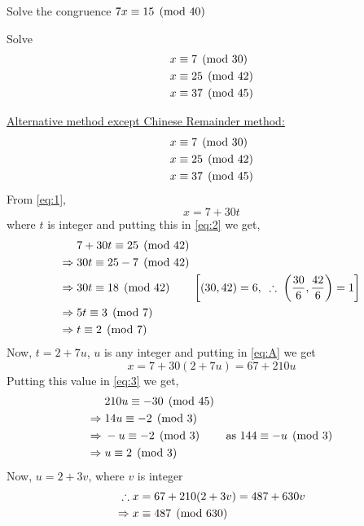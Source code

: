\documentclass[12pt]{book}
\begin{document}
\begin{qn}
    Solve the congruence $ 7x\equiv 15 \pmod{40} $
\end{qn}
\begin{qn}[100E]
    Solve
    \begin{align*}
        x&\equiv 7 \pmod{30}\\
        x&\equiv 25 \pmod{42}\\
        x&\equiv 37 \pmod{45}
    \end{align*}
\end{qn}
\begin{soln}
    \underline{Alternative method except Chinese Remainder method:}
    \begin{align}
        x&\equiv 7 \pmod{30}\label{eq:1}\\
        x&\equiv 25 \pmod{42}\label{eq:2}\\
        x&\equiv 37 \pmod{45}\label{eq:3}
    \end{align}
    From \eqref{eq:1},
    \begin{equation}
        x=7+30t\label{eq:A}
    \end{equation}
    where $ t $ is integer and putting this in \eqref{eq:2} we get,
    \begin{align*}
        & 7+30t\equiv 25 \pmod{42}\\
        \Rightarrow\; & 30t\equiv 25-7 \pmod{42}\\
        \Rightarrow\; & 30t\equiv 18 \pmod{42}\qquad \left[(30,42)=6,\;\;\therefore\;\left( \frac{30}{6},\frac{42}{6} \right)=1\right]\\
        \Rightarrow\; & 5t\equiv 3 \pmod{7}\\
        \Rightarrow\; & t\equiv 2 \pmod{7}
    \end{align*}
    Now, $ t=2+7u $, $ u $ is any integer and putting in \eqref{eq:A} we get
    \[x=7+30(2+7u)=67+210u\]
    Putting this value in \eqref{eq:3} we get,
    \begin{align*}
        &210u\equiv -30 \pmod{45}\\
        \Rightarrow\; &14u\equiv -2 \pmod{3}\\
        \Rightarrow\; &-u\equiv -2 \pmod{3}\qquad\text{ as }144\equiv -u \pmod{3}\\
        \Rightarrow\; &u\equiv 2 \pmod{3}
    \end{align*}
    Now, $ u=2+3v $, where $ v $ is integer
    \begin{align*}
        \therefore\;&x=67+210(2+3v)=487+630v\\
        \Rightarrow\;&x\equiv 487 \pmod{630}
    \end{align*}
\end{soln}
\end{document}
